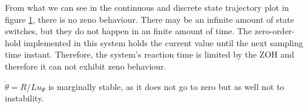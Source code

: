From what we can see in the continuous and discrete state trajectory plot in
figure \ref{fig:05}, there is no zeno behaviour. There may be an infinite amount
of state switches, but they do not happen in an finite amount of time. The
zero-order-hold implemented in this system holds the current value until the
next sampling time instant. Therefore, the system's reaction time is limited by
the ZOH and therefore it can not exhibit zeno behaviour.

$\dot{\theta}=R /Lu_\Psi$ is marginally stable, as it does not go to zero but
as well not to instability.

\begin{figure}[H]\centering
  \scalebox{0.9}{}
  \caption{}
  \label{fig:05}
\end{figure}
